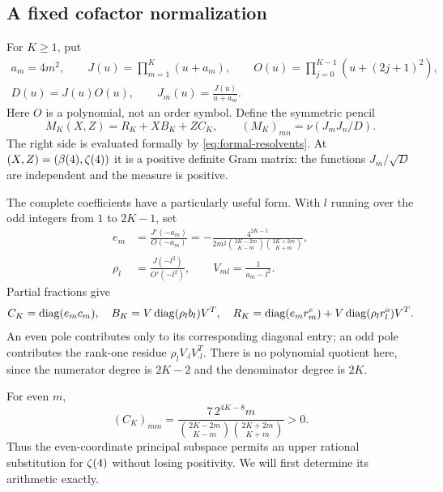 \subsection{A fixed cofactor normalization}
For $K\geq1$, put
\begin{gather*}
 a_m=4m^2,\qquad J(u)=\prod_{m=1}^K(u+a_m),\qquad
 O(u)=\prod_{j=0}^{K-1}(u+(2j+1)^2),\\
 D(u)=J(u)O(u),\qquad J_m(u)=\frac{J(u)}{u+a_m}.
\end{gather*}
Here $O$ is a polynomial, not an order symbol. Define the symmetric pencil
\begin{equation}\label{eq:pencil}
 M_K(X,Z)=R_K+XB_K+ZC_K,
 \qquad (M_K)_{mn}=\nu(J_mJ_n/D).
\end{equation}
The right side is evaluated formally by \eqref{eq:formal-resolvents}.
At $(X,Z)=(\beta(4),\zeta(4))$ it is a positive definite Gram matrix: the
functions $J_m/\sqrt D$ are independent and the measure is positive.

The complete coefficients have a particularly useful form. With $l$
running over the odd integers from $1$ to $2K-1$, set
\begin{align}
 e_m&=\frac{J'(-a_m)}{O(-a_m)}
 =-\frac{4^{2K-1}}
 {2m^2\binom{2K-2m}{K-m}\binom{2K+2m}{K+m}},\label{eq:e}\\
 \rho_l&=\frac{J(-l^2)}{O'(-l^2)},\qquad V_{ml}=\frac1{a_m-l^2}.
 \nonumber
\end{align}
Partial fractions give
\begin{equation}\label{eq:coeffmatrices}
 C_K=\operatorname{diag}(e_mc_m),\quad
 B_K=V\operatorname{diag}(\rho_lb_l)V^T,\quad
 R_K=\operatorname{diag}(e_mr_m^e)+V\operatorname{diag}(\rho_lr_l^o)V^T.
\end{equation}
An even pole contributes only to its corresponding diagonal entry;
an odd pole contributes the rank-one residue $\rho_lV_{\cdot l}V_{\cdot l}^T$.
There is no polynomial quotient here, since the numerator degree is
$2K-2$ and the denominator degree is $2K$.

For even $m$,
\begin{equation}\label{eq:cpositive}
 (C_K)_{mm}=
 \frac{7\,2^{4K-8}m}
 {\binom{2K-2m}{K-m}\binom{2K+2m}{K+m}}>0.
\end{equation}
Thus the even-coordinate principal subspace permits an upper rational
substitution for $\zeta(4)$ without losing positivity. We will first
determine its arithmetic exactly.
